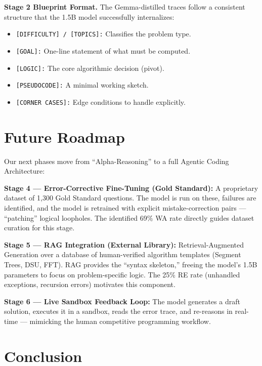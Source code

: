 \documentclass[preprint,12pt]{elsarticle}
\begin{document}
\textbf{Stage 2 Blueprint Format.} The Gemma-distilled traces follow a consistent structure that the 1.5B model successfully internalizes:
\begin{itemize}
    \item \texttt{[DIFFICULTY] / [TOPICS]:} Classifies the problem type.
    \item \texttt{[GOAL]:} One-line statement of what must be computed.
    \item \texttt{[LOGIC]:} The core algorithmic decision (pivot).
    \item \texttt{[PSEUDOCODE]:} A minimal working sketch.
    \item \texttt{[CORNER CASES]:} Edge conditions to handle explicitly.
\end{itemize}

\section{Future Roadmap}
\label{sec:future}

Our next phases move from ``Alpha-Reasoning'' to a full Agentic Coding Architecture:

\textbf{Stage 4 — Error-Corrective Fine-Tuning (Gold Standard):} A proprietary dataset of 1,300 Gold Standard questions. The model is run on these, failures are identified, and the model is retrained with explicit mistake-correction pairs — ``patching'' logical loopholes. The identified 69\% WA rate directly guides dataset curation for this stage.

\textbf{Stage 5 — RAG Integration (External Library):} Retrieval-Augmented Generation over a database of human-verified algorithm templates (Segment Trees, DSU, FFT). RAG provides the ``syntax skeleton,'' freeing the model's 1.5B parameters to focus on problem-specific logic. The 25\% RE rate (unhandled exceptions, recursion errors) motivates this component.

\textbf{Stage 6 — Live Sandbox Feedback Loop:} The model generates a draft solution, executes it in a sandbox, reads the error trace, and re-reasons in real-time — mimicking the human competitive programming workflow.

\section{Conclusion}
\label{sec:conclusion}
\end{document}
